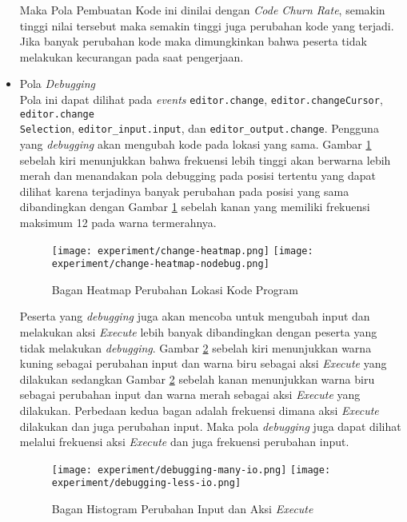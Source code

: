 \begin{itemize}
    Maka Pola Pembuatan Kode ini dinilai dengan \textit{Code Churn Rate}, semakin tinggi nilai tersebut maka semakin tinggi juga perubahan kode yang terjadi. Jika banyak perubahan kode maka dimungkinkan bahwa peserta tidak melakukan kecurangan pada saat pengerjaan.

    \item Pola \textit{Debugging} \\
    Pola ini dapat dilihat pada \textit{events} \verb|editor.change|, \verb|editor.changeCursor|, \verb|editor.change|\\\verb|Selection|, \verb|editor_input.input|, dan \verb|editor_output.change|. Pengguna yang \textit{debugging} akan mengubah kode pada lokasi yang sama. Gambar \ref{fig:5:2:3:heatmapchange} sebelah kiri menunjukkan bahwa frekuensi lebih tinggi akan berwarna lebih merah dan menandakan pola debugging pada posisi tertentu yang dapat dilihat karena terjadinya banyak perubahan pada posisi yang sama dibandingkan dengan Gambar \ref{fig:5:2:3:heatmapchange} sebelah kanan yang memiliki frekuensi maksimum 12 pada warna termerahnya.

    \begin{figure}[H]
        \centering
        \texttt{[image: experiment/change-heatmap.png]}
        \texttt{[image: experiment/change-heatmap-nodebug.png]}
        \caption{Bagan Heatmap Perubahan Lokasi Kode Program}
        \label{fig:5:2:3:heatmapchange}
    \end{figure}
    
    Peserta yang \textit{debugging} juga akan mencoba untuk mengubah input dan melakukan aksi \textit{Execute} lebih banyak dibandingkan dengan peserta yang tidak melakukan \textit{debugging}. Gambar \ref{fig:5:2:3:debug} sebelah kiri menunjukkan warna kuning sebagai perubahan input dan warna biru sebagai aksi \textit{Execute} yang dilakukan sedangkan Gambar \ref{fig:5:2:3:debug} sebelah kanan menunjukkan warna biru sebagai perubahan input dan warna merah sebagai aksi \textit{Execute} yang dilakukan. Perbedaan kedua bagan adalah frekuensi dimana aksi \textit{Execute} dilakukan dan juga perubahan input. Maka pola \textit{debugging} juga dapat dilihat melalui frekuensi aksi \textit{Execute} dan juga frekuensi perubahan input.

    \begin{figure}[H]
        \centering
        \texttt{[image: experiment/debugging-many-io.png]}
        \texttt{[image: experiment/debugging-less-io.png]}
        \caption{Bagan Histogram Perubahan Input dan Aksi \textit{Execute}}
        \label{fig:5:2:3:debug}
    \end{figure}


\end{itemize}

